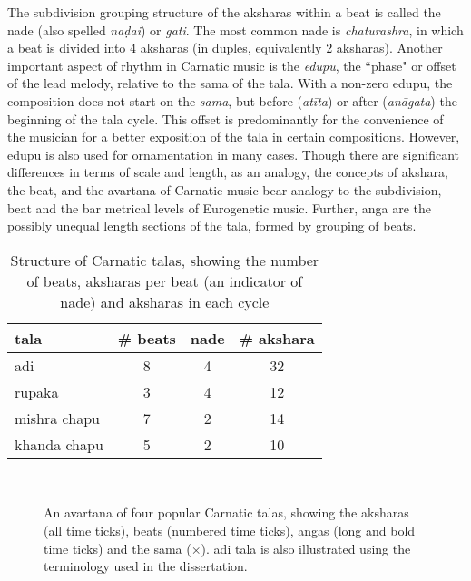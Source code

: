 The subdivision grouping structure of the \glspl{akshara} within a beat is called the \gls{nade} (also spelled \textit{naḍai}) or \emph{gati}. The most common \gls{nade} is \emph{\gls{chaturashra}}, in which a beat is divided into 4 \glspl{akshara} (in duples, equivalently 2 \glspl{akshara}). Another important aspect of rhythm in Carnatic music is the \emph{\gls{edupu}}, the ``phase" or offset of the lead melody, relative to the \gls{sama} of the \gls{tala}. With a non-zero \gls{edupu}, the composition does not start on the \emph{\gls{sama}}, but before (\emph{atīta}) or after (\emph{anāgata}) the beginning of the \gls{tala} cycle. This offset is predominantly for the convenience of the musician for a better exposition of the \gls{tala} in certain compositions. However, \gls{edupu} is also used for ornamentation in many cases. Though there are significant differences in terms of scale and length, as an analogy, the concepts of \gls{akshara}, the beat, and the \gls{avartana} of Carnatic music bear analogy to the subdivision, beat and the bar metrical levels of Eurogenetic music. Further, \gls{anga} are the possibly unequal length sections of the \gls{tala}, formed by grouping of beats. 
%
\begin{table}
\centering
\begin{tabular}{@{}lccc@{}}\toprule
\Gls{tala} & \# beats & \gls{nade} & \# \Gls{akshara} \tabularnewline \midrule
\Gls{adi} & 8 & 4 & 32 \tabularnewline 
\Gls{rupaka}  & 3 & 4 & 12   \tabularnewline
\Gls{mishra chapu}  & 7 & 2 & 14  \tabularnewline
\Gls{khanda chapu} & 5 & 2 & 10 \tabularnewline \bottomrule
\end{tabular}
\caption[Structure of Carnatic \glspl{tala}]{Structure of Carnatic \glspl{tala}, showing the number of beats, \glspl{akshara} per beat (an indicator of \gls{nade}) and \glspl{akshara} in each cycle}\label{tab:cm:talastruct}
\end{table}
%
\begin{figure}
  \centering
{}  \\ 
\caption[Four popular Carnatic \glspl{tala}]{An \gls{avartana} of four popular Carnatic \glspl{tala}, showing the \glspl{akshara} (all time ticks), beats (numbered time ticks), \glspl{anga} (long and bold time ticks) and the sama ($\times$). \Gls{adi} \gls{tala} is also illustrated using the terminology used in the dissertation.}\label{fig:taala:carnatic}
\end{figure}

